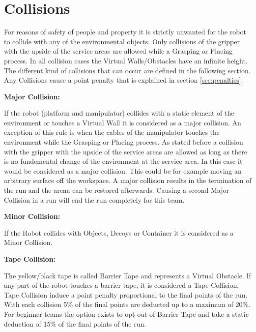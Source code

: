 
\section{Collisions}\label{sec:Collisions}

For reasons of safety of people and property it is strictly unwanted for the robot to collide
with any of the environmental objects. Only collisions of the gripper with the upside of
the service areas are allowed while a Grasping or Placing process. In all collision cases the Virtual Walls/Obstacles have an infinite height. The different kind of collisions that can occur are defined in the
following section. Any Collisions cause a point penalty that is explained in section \ref{sec:penalties}.  

\textbf{Major Collision:}

If the robot (platform and manipulator) collides with a static element of the environment or touches a Virtual Wall it is considered as a major collision. An exception of this rule is when the cables of the manipulator touches the environment while the Grasping or Placing process. As stated before a collision with the  gripper with the upside of the service areas are allowed as long as there is no fundemental change of the environment at the service area. In this case it would be considered as a major collision. This could be for example moving an arbitrary surface off the workspace. A major collision results in the termination of the run and the arena can be restored afterwards. Causing a second Major Collision in a run will end the run completely for this team.


\textbf{Minor Collision:}

If the Robot collides with Objects, Decoys or Container it is considered as a Minor Collision. 


\textbf{Tape Collision:}

The yellow/black tape is called Barrier Tape and represents a Virtual Obstacle. If any part of the robot
touches a barrier tape, it is considered a Tape Collision. Tape Collision induce a point penalty
proportional to the final points of the run. With each collision 5\% of the final points are deducted up to a maximum
of 20\%. For beginner teams the option exists to opt-out of Barrier Tape and take a static deduction of 15\% of the
final points of the run.

